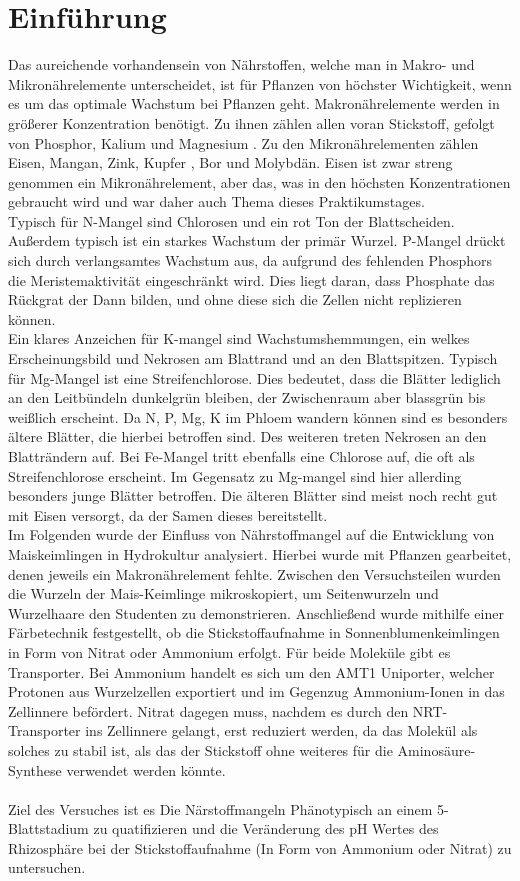 \documentclass[10pt,a4paper]{article}
\begin{document}
	\section{Einführung}	
		Das aureichende vorhandensein von Nährstoffen, welche man in Makro- und Mikronährelemente unterscheidet, ist für Pflanzen von höchster Wichtigkeit, wenn es um das optimale Wachstum bei Pflanzen geht. 
		Makronährelemente werden in größerer Konzentration benötigt. Zu ihnen zählen allen voran Stickstoff, gefolgt von Phosphor, Kalium und Magnesium . Zu den Mikronährelementen zählen Eisen, Mangan, Zink, Kupfer , Bor und Molybdän. Eisen ist zwar streng genommen ein Mikronährelement, aber das, was in den höchsten Konzentrationen gebraucht wird und war daher auch Thema dieses Praktikumstages.\\
		Typisch für N-Mangel sind Chlorosen und ein rot Ton der Blattscheiden. Außerdem typisch ist ein starkes Wachstum der primär Wurzel.
		P-Mangel drückt sich durch verlangsamtes Wachstum aus, da aufgrund des fehlenden Phosphors die Meristemaktivität eingeschränkt wird. Dies liegt daran, dass Phosphate das Rückgrat der Dann bilden, und ohne diese sich die Zellen nicht replizieren können.\\
		Ein klares Anzeichen für K-mangel sind Wachstumshemmungen, ein welkes Erscheinungsbild und Nekrosen am Blattrand und an den Blattspitzen.
		Typisch für Mg-Mangel ist eine Streifenchlorose. Dies bedeutet, dass die Blätter lediglich an den Leitbündeln dunkelgrün bleiben, der Zwischenraum aber blassgrün bis weißlich erscheint. Da N, P, Mg, K im Phloem wandern können sind es besonders ältere Blätter, die hierbei betroffen sind. Des weiteren treten Nekrosen an den Blatträndern auf. 
		Bei Fe-Mangel tritt ebenfalls eine Chlorose auf, die oft als Streifenchlorose erscheint. Im Gegensatz zu Mg-mangel sind hier allerding besonders junge Blätter betroffen. Die älteren Blätter sind meist noch recht gut mit Eisen versorgt, da der Samen dieses bereitstellt.\\
		Im Folgenden wurde der Einfluss von Nährstoffmangel auf die Entwicklung von Maiskeimlingen in Hydrokultur analysiert. Hierbei wurde mit Pflanzen gearbeitet, denen jeweils ein Makronährelement fehlte. Zwischen den Versuchsteilen wurden die Wurzeln der Mais-Keimlinge mikroskopiert, um Seitenwurzeln und Wurzelhaare den Studenten zu demonstrieren. Anschließend wurde mithilfe einer Färbetechnik festgestellt, ob die Stickstoffaufnahme in Sonnenblumenkeimlingen in Form von Nitrat oder Ammonium erfolgt. Für beide Moleküle gibt es Transporter. Bei Ammonium handelt es sich um den AMT1 Uniporter, welcher Protonen aus Wurzelzellen exportiert und im Gegenzug Ammonium-Ionen in das Zellinnere befördert. Nitrat dagegen muss, nachdem es durch den NRT-Transporter ins Zellinnere gelangt, erst reduziert werden, da das Molekül als solches zu stabil ist, als das der Stickstoff ohne weiteres für die Aminosäure-Synthese verwendet werden könnte.\\
		\\
		Ziel des Versuches ist es Die Närstoffmangeln Phänotypisch an einem 5-Blattstadium zu quatifizieren und die Veränderung des pH Wertes des Rhizosphäre bei der Stickstoffaufnahme (In Form von Ammonium oder Nitrat) zu untersuchen.
	
\end{document}
